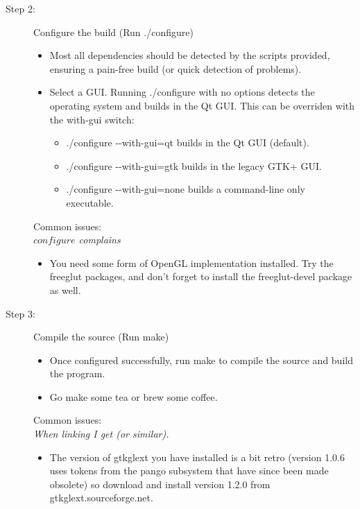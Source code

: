 \begin{description}
	\item[Step 2:\its] Configure the build (Run {\sffamily./configure})
	\begin{itemize}
		\item Most all dependencies should be detected by the scripts provided, ensuring a pain-free build (or quick detection of problems).
		\item Select a GUI. Running {\sffamily./configure} with no options detects the operating system and builds in the Qt GUI. This can be overriden with the {\sffamily {-}{-}with-gui} switch:
		\begin{itemize}
			\item {\sffamily./configure {-}{-}with-gui=qt} builds in the Qt GUI (default).
			\item {\sffamily./configure {-}{-}with-gui=gtk} builds in the legacy GTK+ GUI.
			\item {\sffamily./configure {-}{-}with-gui=none} builds a command-line only executable.
		\end{itemize}
	\end{itemize}
	Common issues:\\
	\emph{$configure$ complains }
	\begin{itemize}
		\item You need some form of OpenGL implementation installed. Try the freeglut packages, and don't forget to install the freeglut-devel package as well.
	\end{itemize}
\end{description}

\begin{description}
	\item[Step 3:\its] Compile the source (Run {\sffamily make})
	\begin{itemize}
		\item Once configured successfully, run {\sffamily make} to compile the source and build the program.
		\item Go make some tea or brew some coffee.
	\end{itemize}
	Common issues:\\
	\emph{When linking I get  (or similar).}
	\begin{itemize}
		\item The version of gtkglext you have installed is a bit retro (version 1.0.6 uses tokens from the pango subsystem that have since been made obsolete) so download and install version 1.2.0 from gtkglext.sourceforge.net.
	\end{itemize}

\end{description}

